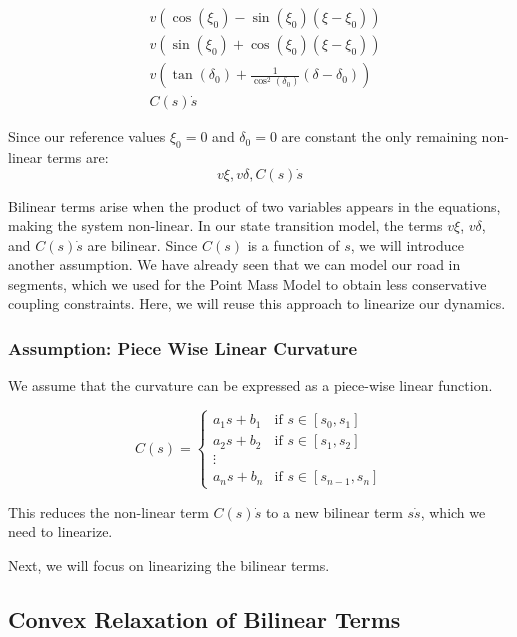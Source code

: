 \begin{align*}
	 & v (\cos(\xi_0) - \sin(\xi_0) (\xi - \xi_0))                         \\
	 & v (\sin(\xi_0) + \cos(\xi_0) (\xi - \xi_0))                         \\
	 & v (\tan(\delta_0) + \frac{1}{\cos^2(\delta_0)} (\delta - \delta_0)) \\
	 & C(s)\dot{s}
\end{align*}

Since our reference values $\xi_0 = 0$ and $\delta_0 = 0$ are constant the only remaining non-linear terms are: $$v \xi, v \delta, C(s)\dot{s}$$

Bilinear terms arise when the product of two variables appears in the equations, making the system non-linear.
In our state transition model, the terms \(v \xi\), \(v \delta\), and \(C(s)\dot{s}\) are bilinear.
Since \(C(s)\) is a function of \(s\), we will introduce another assumption.
We have already seen that we can model our road in segments, which we used for the Point Mass Model to obtain less conservative coupling constraints.
Here, we will reuse this approach to linearize our dynamics.

\subsubsection{Assumption: Piece Wise Linear Curvature}

We assume that the curvature can be expressed as a piece-wise linear function.

\[
	C(s) = \begin{cases}
		a_1s+b_1 & \text{if } s \in [s_0, s_1]     \\
		a_2s+b_2 & \text{if } s \in [s_1, s_2]     \\
		\vdots                                     \\
		a_ns+b_n & \text{if } s \in [s_{n-1}, s_n]
	\end{cases}
\]

This reduces the non-linear term \(C(s)\dot{s}\) to a new bilinear term \(s\dot{s}\), which we need to linearize.

Next, we will focus on linearizing the bilinear terms.

\subsection{Convex Relaxation of Bilinear Terms} \label{subsec:convex_relaxation_for_bilinear_terms}

